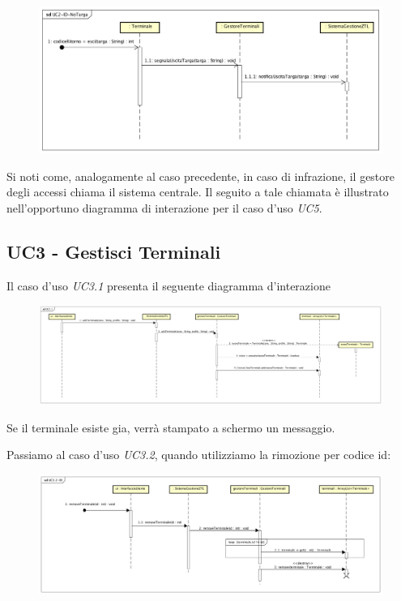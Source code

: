 \documentclass[12pt, letterpaper]{article}
\begin{document}
\begin{figure}[H]
    \centering
    \includegraphics[scale=0.40]{UC2-ID-NoTarga}
\end{figure} 

\noindent
Si noti come, analogamente al caso precedente,
in caso di infrazione, il gestore degli accessi 
chiama il sistema centrale.
Il seguito a tale chiamata è illustrato nell'opportuno 
diagramma di interazione per il caso d'uso \emph{UC5}.

\subsection{UC3 - Gestisci Terminali}
Il caso d'uso \emph{UC3.1} presenta il seguente diagramma
d'interazione
\begin{figure}[H]
    \centering
    \includegraphics[scale=0.18]{UC3.1-ID}
\end{figure} 

\noindent
Se il terminale esiste gia, verrà stampato a schermo un 
messaggio.

\noindent
Passiamo al caso d'uso \emph{UC3.2}, quando utilizziamo
la rimozione per codice id:

\begin{figure}[H]
    \centering
    \includegraphics[scale=0.25]{UC3.2-ID-ID}
\end{figure} 
\end{document}

